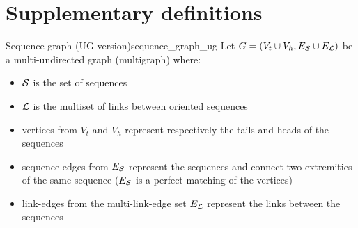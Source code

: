 \section{Supplementary definitions}

\begin{definition}
  {Sequence graph (UG version)}{sequence_graph_ug} Let
  \(G = (V_{t} \cup V_{h}, E_{\mathcal{S}{}} \cup E_{\mathcal{L}}{})\) be a multi-undirected
  graph (multigraph) where:

  \begin{itemize}
    \item \(\mathcal{S}{}\) is the set of sequences

    \item \(\mathcal{L}{}\) is the multiset of links between oriented sequences

    \item vertices from \(V_{t}\) and \(V_{h}\) represent respectively the tails
      and heads of the sequences

    \item sequence-edges from \(E_{\mathcal{S}{}}\) represent the sequences and connect
      two extremities of the same sequence (\(E_{\mathcal{S}{}}\) is a perfect
      matching of the vertices)

    \item link-edges from the multi-link-edge set \(E_{\mathcal{L}}{}\) represent
      the links between the sequences
  \end{itemize}
\end{definition}